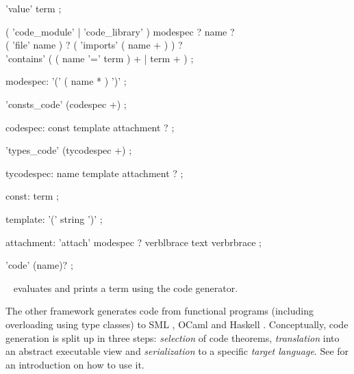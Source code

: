 \begin{isabellebody}
\begin{isamarkuptext}
  \begin{rail}
  'value' term
  ;

  ( 'code\_module' | 'code\_library' ) modespec ? name ? \\
    ( 'file' name ) ? ( 'imports' ( name + ) ) ? \\
    'contains' ( ( name '=' term ) + | term + )
  ;

  modespec: '(' ( name * ) ')'
  ;

  'consts\_code' (codespec +)
  ;

  codespec: const template attachment ?
  ;

  'types\_code' (tycodespec +)
  ;

  tycodespec: name template attachment ?
  ;

  const: term
  ;

  template: '(' string ')'
  ;

  attachment: 'attach' modespec ? verblbrace text verbrbrace
  ;

  'code' (name)?
  ;
  \end{rail}

  \begin{description}

  \item \hyperlink{command.HOL.value}{\mbox{}}~ evaluates and prints a term
  using the code generator.

  \end{description}

  \medskip The other framework generates code from functional programs
  (including overloading using type classes) to SML \cite{SML}, OCaml
  \cite{OCaml} and Haskell \cite{haskell-revised-report}.
  Conceptually, code generation is split up in three steps:
  \emph{selection} of code theorems, \emph{translation} into an
  abstract executable view and \emph{serialization} to a specific
  \emph{target language}.  See \cite{isabelle-codegen} for an
  introduction on how to use it.


\end{isamarkuptext}
\end{isabellebody}
